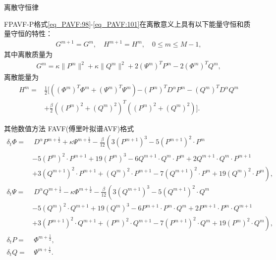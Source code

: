 \documentclass[aspectratio=169]{beamer}
\numberwithin{theorem}{section} %
\numberwithin{equation}{section}%
\numberwithin{figure}{section}%
\numberwithin{table}{section}%
\begin{document}
\begin{frame}{离散守恒律}
	\begin{theorem}\label{thm_PAVF:4}
		FPAVF-P格式\eqref{eq_PAVF:98}-\eqref{eq_PAVF:101}在离散意义上具有以下能量守恒和质量守恒的特性：
		\begin{align}\label{eq_PAVF:11141}
		G^{m+1}=G^{m}, \quad H^{m+1}=H^{m}, \quad 0 \leq m \leq M-1,
		\end{align}
		其中离散质量为
		\begin{align}\label{eq_PAVF:11142}
		G^{m}=\kappa\|P^{m}\|^2+\kappa\|Q^{m}\|^2+2 \left(\Psi^{m}\right)^T P^{m}-2 \left(\varPhi^{m}\right)^T Q^{m},
		\end{align}
		离散能量为
		\begin{align}
		H^{m}=&\frac{1}{2}[((\varPhi^{m})^{T}\varPhi^{m}+(\Psi^{m})^{T}\Psi^{m}){-(P^{m})^{T} D^{\alpha} P^{m}-(Q^{m})^{T} D^{\alpha} Q^{m}}\nonumber\\
		&+\frac{\beta}{2}((P^{m})^2+(Q^{m})^2)^{T}((P^{m})^2+(Q^{m})^2)].\label{eq_PAVF:800}
		\end{align}
		\end{theorem}
\end{frame}
\begin{frame}{其他数值方法}
	\noindent FAVF(傅里叶拟谱AVF)格式
	{\small\begin{align}
	\delta_{t} \varPhi =&~{D^{\alpha} P^{m+\frac{1}{2}}}+\kappa \Psi^{m+\frac{1}{2}}-\frac{\beta}{12}\left(3 (P^{m+1})^3-5 (P^{m+1})^2\cdot P^{m}\right.\nonumber\\
			&-5 (P^{m})^2\cdot P^{m+1}+19 (P^{m})^3-6 Q^{m+1}\cdot Q^{m}\cdot P^{m}+2 Q^{m+1}\cdot Q^{m}\cdot P^{m+1} \nonumber\\
			&+\left. 3 (Q^{m+1})^2\cdot P^{m+1}+(Q^{m})^2\cdot P^{m+1}-7 (Q^{m+1})^2\cdot P^{m}+19 (Q^{m} )^2\cdot P^{m}\right),\label{eq_PAVF:66}\\
	\delta_{t} \Psi =&~{D^{\alpha} Q^{m+\frac{1}{2}}}-\kappa \varPhi^{m+\frac{1}{2}}-\frac{\beta}{12}\left(3 (Q^{m+1})^3-5 (Q^{m+1})^2\cdot Q^{m}\right.\nonumber\\
			&-5 (Q^{m})^2\cdot Q^{m+1}+19 (Q^{m})^3-6 P^{m+1}\cdot P^{m}\cdot Q^{m}+2 P^{m+1}\cdot P^{m}\cdot Q^{m+1} \nonumber\\
			&+\left. 3 (P^{m+1})^2\cdot Q^{m+1}+(P^{m})^2\cdot Q^{m+1}-7 (P^{m+1})^2\cdot Q^{m}+19 (P^{m} )^2\cdot Q^{m}\right),\label{eq_PAVF:67}\\
	\delta_{t} P=&~\varPhi^{m+\frac{1}{2}},\label{eq_PAVF:68}\\
	\delta_{t} Q=&~\Psi^{m+\frac{1}{2}}.\label{eq_PAVF:69}
	\end{align}}
\end{frame}
\end{document}
